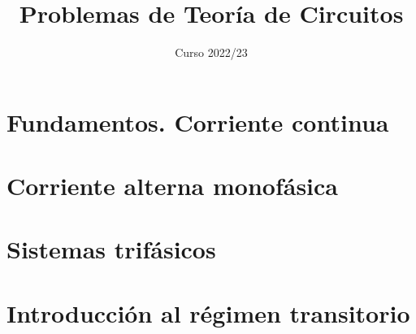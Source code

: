 \documentclass[oldfontcommands,a4paper]{memoir}
\begin{document}
\begin{titlingpage}

\title{Problemas de Teoría de Circuitos}

\author{}

\date{Curso 2022/23}

\maketitle


\end{titlingpage}

\frontmatter

\cleardoublepage{}

\tableofcontents*

\cleardoublepage{}

\mainmatter

\chapter{Fundamentos. Corriente continua}



\chapter{Corriente alterna monofásica}



\chapter{Sistemas trifásicos}



\chapter{Introducción al régimen transitorio}




\backmatter
\end{document}

